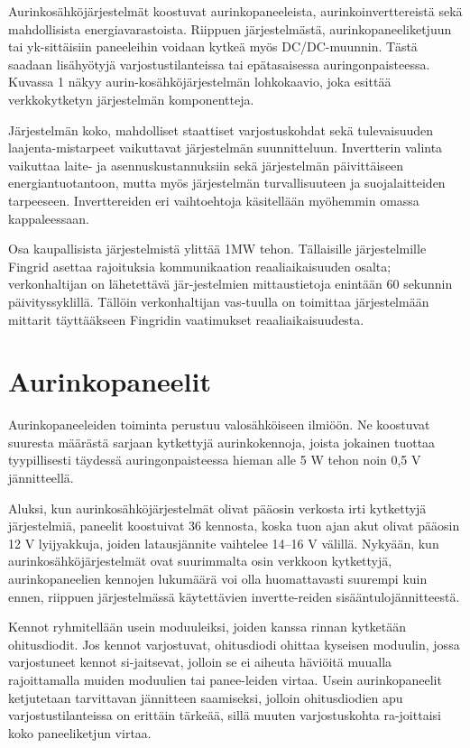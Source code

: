 Aurinkosähköjärjestelmät koostuvat aurinkopaneeleista, aurinkoinverttereistä sekä mahdollisista energiavarastoista. Riippuen järjestelmästä, aurinkopaneeliketjuun tai yk-sittäisiin paneeleihin voidaan kytkeä myös DC/DC-muunnin. Tästä saadaan lisähyötyjä varjostustilanteissa tai epätasaisessa auringonpaisteessa.  Kuvassa 1 näkyy aurin-kosähköjärjestelmän lohkokaavio, joka esittää verkkokytketyn järjestelmän komponentteja. 

Järjestelmän koko, mahdolliset staattiset varjostuskohdat sekä tulevaisuuden laajenta-mistarpeet vaikuttavat järjestelmän suunnitteluun. Invertterin valinta vaikuttaa laite- ja asennuskustannuksiin sekä järjestelmän päivittäiseen energiantuotantoon, mutta myös järjestelmän turvallisuuteen ja suojalaitteiden tarpeeseen. Inverttereiden eri vaihtoehtoja käsitellään myöhemmin omassa kappaleessaan.

Osa kaupallisista järjestelmistä ylittää 1MW tehon. Tällaisille järjestelmille Fingrid asettaa rajoituksia kommunikaation reaaliaikaisuuden osalta; verkonhaltijan on lähetettävä jär-jestelmien mittaustietoja enintään 60 sekunnin päivityssyklillä. Tällöin verkonhaltijan vas-tuulla on toimittaa järjestelmään mittarit täyttääkseen Fingridin vaatimukset reaaliaikaisuudesta.  

\section{Aurinkopaneelit}
  Aurinkopaneeleiden toiminta perustuu valosähköiseen ilmiöön. Ne koostuvat suuresta määrästä sarjaan kytkettyjä aurinkokennoja, joista jokainen tuottaa tyypillisesti täydessä auringonpaisteessa hieman alle 5 W tehon noin 0,5 V jännitteellä. 

  Aluksi, kun aurinkosähköjärjestelmät olivat pääosin verkosta irti kytkettyjä järjestelmiä, paneelit koostuivat 36 kennosta, koska tuon ajan akut olivat pääosin 12 V lyijyakkuja, joiden latausjännite vaihtelee 14–16 V välillä. Nykyään, kun aurinkosähköjärjestelmät ovat suurimmalta osin verkkoon kytkettyjä, aurinkopaneelien kennojen lukumäärä voi olla huomattavasti suurempi kuin ennen, riippuen järjestelmässä käytettävien invertte-reiden sisääntulojännitteestä. 

  Kennot ryhmitellään usein moduuleiksi, joiden kanssa rinnan kytketään ohitusdiodit. Jos kennot varjostuvat, ohitusdiodi ohittaa kyseisen moduulin, jossa varjostuneet kennot si-jaitsevat, jolloin se ei aiheuta häviöitä muualla rajoittamalla muiden moduulien tai panee-leiden virtaa. Usein aurinkopaneelit ketjutetaan tarvittavan jännitteen saamiseksi, jolloin ohitusdiodien apu varjostustilanteissa on erittäin tärkeää, sillä muuten varjostuskohta ra-joittaisi koko paneeliketjun virtaa. 

